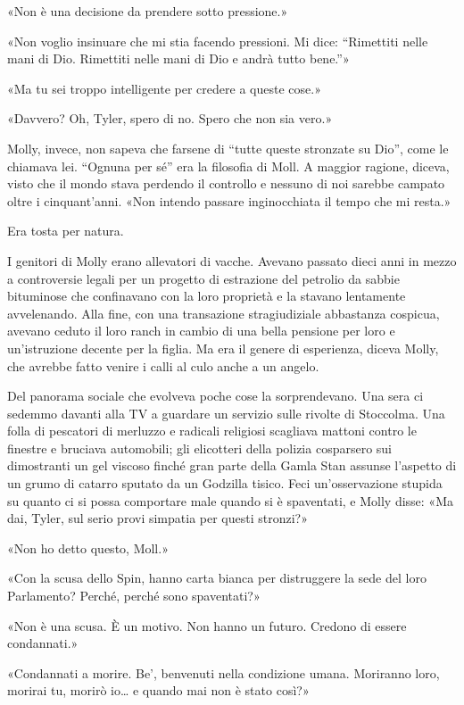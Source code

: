 «Non è una decisione da prendere sotto pressione.»

«Non voglio insinuare che mi stia facendo pressioni. Mi dice:
``Rimettiti nelle mani di Dio. Rimettiti nelle mani di Dio e andrà tutto
bene.''»

«Ma tu sei troppo intelligente per credere a queste cose.»

«Davvero? Oh, Tyler, spero di no. Spero che non sia vero.»

\separatorefiori

Molly, invece, non sapeva che farsene di ``tutte queste stronzate su
Dio'', come le chiamava lei. ``Ognuna per sé'' era la filosofia di Moll.
A maggior ragione, diceva, visto che il mondo stava perdendo il
controllo e nessuno di noi sarebbe campato oltre i cinquant'anni. «Non
intendo passare inginocchiata il tempo che mi resta.»

Era tosta per natura.

I genitori di Molly erano allevatori di vacche. Avevano passato dieci
anni in mezzo a controversie legali per un progetto di estrazione del
petrolio da sabbie bituminose che confinavano con la loro proprietà e la
stavano lentamente avvelenando. Alla fine, con una transazione
stragiudiziale abbastanza cospicua, avevano ceduto il loro ranch in
cambio di una bella pensione per loro e un'istruzione decente per la
figlia. Ma era il genere di esperienza, diceva Molly, che avrebbe fatto
venire i calli al culo anche a un angelo.

Del panorama sociale che evolveva poche cose la sorprendevano. Una sera
ci sedemmo davanti alla TV a guardare un servizio sulle rivolte di
Stoccolma. Una folla di pescatori di merluzzo e radicali religiosi
scagliava mattoni contro le finestre e bruciava automobili; gli
elicotteri della polizia cosparsero sui dimostranti un gel viscoso
finché gran parte della Gamla Stan assunse l'aspetto di un grumo di
catarro sputato da un Godzilla tisico. Feci un'osservazione stupida su
quanto ci si possa comportare male quando si è spaventati, e Molly
disse: «Ma dai, Tyler, sul serio provi simpatia per questi stronzi?»

«Non ho detto questo, Moll.»

«Con la scusa dello Spin, hanno carta bianca per distruggere la sede del
loro Parlamento? Perché, perché sono spaventati?»

«Non è una scusa. È un motivo. Non hanno un futuro. Credono di essere
condannati.»

«Condannati a morire. Be', benvenuti nella condizione umana. Moriranno
loro, morirai tu, morirò io\ldots{} e quando mai non è stato così?»

